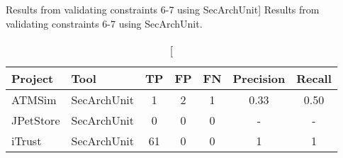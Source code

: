 \begin{table}
\captionsetup{justification=centering}
\caption
    [Results from validating constraints 6-7 using SecArchUnit]
    {Results from validating constraints 6-7 using SecArchUnit.}
\begin{center}
\begin{tabular}{llccccc}
\textbf{Project} & \textbf{Tool}    & \textbf{TP} & \textbf{FP} & \textbf{FN} & \textbf{Precision} & \textbf{Recall} \\
\hline
ATMSim     & SecArchUnit & 1 & 2  & 1  & 0.33         & 0.50    \\
JPetStore  & SecArchUnit & 0 & 0  & 0  & -         & -    \\
iTrust     & SecArchUnit & 61 & 0  & 0  & 1         & 1    \\
\hline
\end{tabular}
\end{center}
\label{tab:tool_extension}
\end{table}